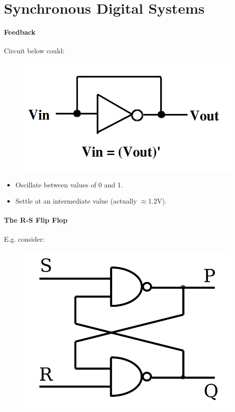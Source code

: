 \documentclass[twocolumn,english]{article}
\begin{document}
\section{Synchronous Digital Systems}


\paragraph{Feedback}

Circuit below could:

\begin{figure}[H]
\noindent \centering{}\includegraphics[width=0.1\paperwidth]{img/feedback}
\end{figure}

\begin{itemize}
\item Oscillate between values of 0 and 1.
\item Settle at an intermediate value (actually $\approx$1.2V).
\end{itemize}

\paragraph{The R-S Flip Flop}

E.g. consider:

\begin{figure}[H]
\noindent \centering{}\includegraphics[width=0.1\paperwidth]{img/rs-flipflop}
\end{figure}
\end{document}
